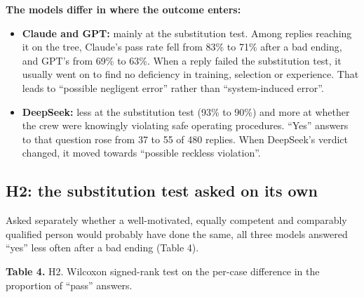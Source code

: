 \documentclass[review,12pt]{elsarticle}
\providecommand{\tightlist}{\setlength{\itemsep}{0pt}\setlength{\parskip}{0pt}}
\begin{document}
\textbf{The models differ in where the outcome enters:}

\begin{itemize}
\tightlist
\item
  \textbf{Claude and GPT:} mainly at the substitution test. Among replies reaching it on the tree, Claude's pass rate fell from 83\% to 71\% after a bad ending, and GPT's from 69\% to 63\%. When a reply failed the substitution test, it usually went on to find no deficiency in training, selection or experience. That leads to ``possible negligent error'' rather than ``system-induced error''.
\item
  \textbf{DeepSeek:} less at the substitution test (93\% to 90\%) and more at whether the crew were knowingly violating safe operating procedures. ``Yes'' answers to that question rose from 37 to 55 of 480 replies. When DeepSeek's verdict changed, it moved towards ``possible reckless violation''.
\end{itemize}

\hypertarget{h2-the-substitution-test-asked-on-its-own}{%
\subsection{H2: the substitution test asked on its own}\label{h2-the-substitution-test-asked-on-its-own}}

Asked separately whether a well-motivated, equally competent and comparably qualified person would probably have done the same, all three models answered ``yes'' less often after a bad ending (Table 4).

\noindent\textbf{Table 4.} H2. Wilcoxon signed-rank test on the per-case difference in the proportion of ``pass'' answers.
\end{document}
